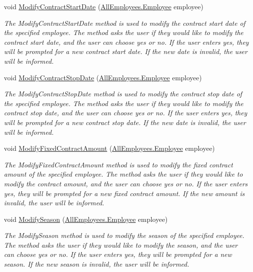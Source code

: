 \begin{DoxyCompactItemize}
void \hyperlink{class_the_company_1_1_container_aa631559b361ba4cd6b7499d6e57af5c2}{Modify\+Contract\+Start\+Date} (\hyperlink{class_all_employees_1_1_employee}{All\+Employees.\+Employee} employee)
\begin{DoxyCompactList}\small\item\em The Modify\+Contract\+Start\+Date method is used to modify the contract start date of the specified employee. The method asks the user if they would like to modify the contract start date, and the user can choose yes or no. If the user enters yes, they will be prompted for a new contract start date. If the new date is invalid, the user will be informed. \end{DoxyCompactList}\item 
void \hyperlink{class_the_company_1_1_container_a5966b88fe1b802920e09d984f40454f0}{Modify\+Contract\+Stop\+Date} (\hyperlink{class_all_employees_1_1_employee}{All\+Employees.\+Employee} employee)
\begin{DoxyCompactList}\small\item\em The Modify\+Contract\+Stop\+Date method is used to modify the contract stop date of the specified employee. The method asks the user if they would like to modify the contract stop date, and the user can choose yes or no. If the user enters yes, they will be prompted for a new contract stop date. If the new date is invalid, the user will be informed. \end{DoxyCompactList}\item 
void \hyperlink{class_the_company_1_1_container_aa5548ce6d63db43b96e7002a6b398a64}{Modify\+Fixed\+Contract\+Amount} (\hyperlink{class_all_employees_1_1_employee}{All\+Employees.\+Employee} employee)
\begin{DoxyCompactList}\small\item\em The Modify\+Fixed\+Contract\+Amount method is used to modify the fixed contract amount of the specified employee. The method asks the user if they would like to modify the contract amount, and the user can choose yes or no. If the user enters yes, they will be prompted for a new fixed contract amount. If the new amount is invalid, the user will be informed. \end{DoxyCompactList}\item 
void \hyperlink{class_the_company_1_1_container_af4aa83f1b02b8783ead9bae2edc771d3}{Modify\+Season} (\hyperlink{class_all_employees_1_1_employee}{All\+Employees.\+Employee} employee)
\begin{DoxyCompactList}\small\item\em The Modify\+Season method is used to modify the season of the specified employee. The method asks the user if they would like to modify the season, and the user can choose yes or no. If the user enters yes, they will be prompted for a new season. If the new season is invalid, the user will be informed. \end{DoxyCompactList}\item 

\end{DoxyCompactItemize}
